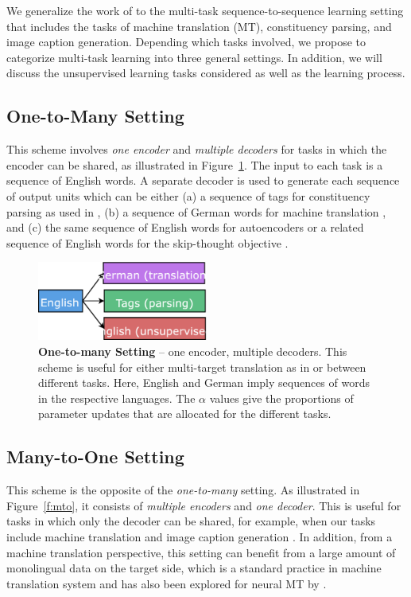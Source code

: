 We generalize the work of \citet{dong15} to the multi-task sequence-to-sequence
learning setting that includes the tasks of machine translation (MT),
constituency parsing, and image caption generation. Depending which tasks 
involved, we propose to categorize multi-task \ssl{} learning into three general
settings.
In addition, we will discuss the unsupervised learning tasks considered as well
as the learning process.

\subsection{One-to-Many Setting}
\label{subsec:otm}
This scheme involves {\it one encoder} and {\it multiple decoders} for tasks in
which the encoder can be shared, as illustrated in
Figure~\ref{f:otm}. The input to each task is a sequence of
English words. A separate decoder is used to generate each sequence of
output units which can be either (a) a sequence of tags for
constituency parsing as used in \citep{vinyals15grammar}, (b) a
sequence of German words for machine translation \citep{luong15attn},
and (c) the same sequence of English words for autoencoders or a
related sequence of English words for the skip-thought objective
\citep{kiros15skip}.

\begin{figure}
\centering
\includegraphics[width=0.5\textwidth, clip=true, trim= 0 0 0
0]{img/6-1_otm}
\caption{{\bf One-to-many Setting} -- one encoder, multiple decoders. This scheme
is useful for either multi-target translation as
in \cite{dong15} or between different tasks. Here, English and
German imply sequences of words in the respective languages. The $\alpha$ values
give the proportions of parameter updates that are allocated for the different tasks.
} 
\label{f:otm}
\end{figure}

\subsection{Many-to-One Setting}
\label{subsec:mto}
This scheme is the opposite of the {\it one-to-many}
setting. As illustrated in Figure~\ref{f:mto}, it consists of {\it multiple
encoders} and {\it one decoder}. This is useful for tasks in which only the
decoder can be shared, for example, when our tasks include machine translation
and image caption generation \citep{vinyals15caption}. In addition, from a machine
translation perspective, this setting can benefit from a large
amount of monolingual data on the target side, which is a standard
practice in machine translation system and has also been explored
for neural MT by \cite{gulcehre2015using}.

